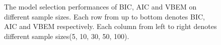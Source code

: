 \documentclass[12pt,a4paper]{article}
\theoremstyle{definition}
\begin{document}
\begin{figure}[htbp]
{	}
	\caption{The model selection performances of BIC, AIC and VBEM on different sample sizes. Each row from up to bottom denotes BIC, AIC and VBEM respectively. Each column from left to right denotes different sample sizes(5, 10, 30, 50, 100).}
	\label{fig:sample_comp1}
\end{figure}
\end{document}
